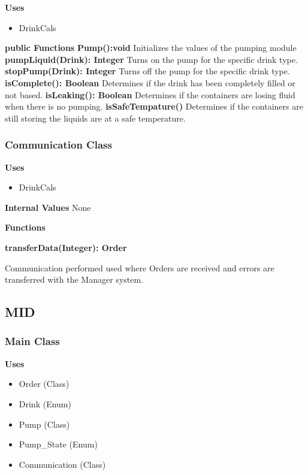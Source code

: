 \documentclass [10pt]{article}
\begin{document}
\textbf{Uses}

\begin{itemize}
	\item DrinkCals
\end{itemize}


\textbf{public Functions}
\textbf{Pump():void}
Initializes the values of the pumping module
\textbf{pumpLiquid(Drink): Integer}
Turns on the pump for the specific drink type.
\textbf{stopPump(Drink): Integer}
Turns off the pump for the specific drink type.
\textbf{isComplete(): Boolean}
Determines if the drink has been completely filled or not based.
\textbf{isLeaking(): Boolean}
Determines if the containers are losing fluid when there is no pumping.
\textbf{isSafeTempature()}
Determines if the containers are still storing the liquids are at a safe temperature.

\subsubsection{Communication Class}

\textbf{Uses}

\begin{itemize}
	\item DrinkCals
\end{itemize}

\textbf{Internal Values}
None

\textbf{Functions}

\textbf{transferData(Integer): Order}

Communication performed used  where Orders are received and errors are transferred with the Manager system.


\subsection{MID}

\subsubsection{Main Class}

\textbf{Uses}
\begin{itemize}
	\item Order (Class)
	\item Drink (Enum)
	\item Pump (Class)
	\item Pump\_State (Enum)
	\item Communication (Class)
\end{itemize}
\end{document}
